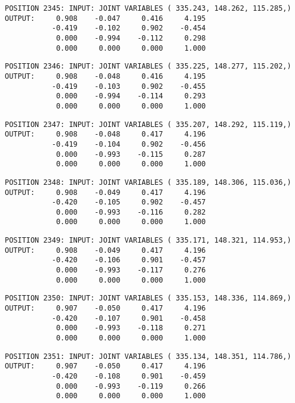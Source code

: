 \begin{verbatim}
POSITION 2345: INPUT: JOINT VARIABLES ( 335.243, 148.262, 115.285,)
OUTPUT:     0.908    -0.047     0.416     4.195
           -0.419    -0.102     0.902    -0.454
            0.000    -0.994    -0.112     0.298
            0.000     0.000     0.000     1.000
\end{verbatim} \pagebreak[1]\begin{verbatim}
POSITION 2346: INPUT: JOINT VARIABLES ( 335.225, 148.277, 115.202,)
OUTPUT:     0.908    -0.048     0.416     4.195
           -0.419    -0.103     0.902    -0.455
            0.000    -0.994    -0.114     0.293
            0.000     0.000     0.000     1.000
\end{verbatim} \pagebreak[1]\begin{verbatim}
POSITION 2347: INPUT: JOINT VARIABLES ( 335.207, 148.292, 115.119,)
OUTPUT:     0.908    -0.048     0.417     4.196
           -0.419    -0.104     0.902    -0.456
            0.000    -0.993    -0.115     0.287
            0.000     0.000     0.000     1.000
\end{verbatim} \pagebreak[1]\begin{verbatim}
POSITION 2348: INPUT: JOINT VARIABLES ( 335.189, 148.306, 115.036,)
OUTPUT:     0.908    -0.049     0.417     4.196
           -0.420    -0.105     0.902    -0.457
            0.000    -0.993    -0.116     0.282
            0.000     0.000     0.000     1.000
\end{verbatim} \pagebreak[1]\begin{verbatim}
POSITION 2349: INPUT: JOINT VARIABLES ( 335.171, 148.321, 114.953,)
OUTPUT:     0.908    -0.049     0.417     4.196
           -0.420    -0.106     0.901    -0.457
            0.000    -0.993    -0.117     0.276
            0.000     0.000     0.000     1.000
\end{verbatim} \pagebreak[1]\begin{verbatim}
POSITION 2350: INPUT: JOINT VARIABLES ( 335.153, 148.336, 114.869,)
OUTPUT:     0.907    -0.050     0.417     4.196
           -0.420    -0.107     0.901    -0.458
            0.000    -0.993    -0.118     0.271
            0.000     0.000     0.000     1.000
\end{verbatim} \pagebreak[1]\begin{verbatim}
POSITION 2351: INPUT: JOINT VARIABLES ( 335.134, 148.351, 114.786,)
OUTPUT:     0.907    -0.050     0.417     4.196
           -0.420    -0.108     0.901    -0.459
            0.000    -0.993    -0.119     0.266
            0.000     0.000     0.000     1.000
\end{verbatim} \pagebreak[1]\begin{verbatim}

\end{verbatim}
